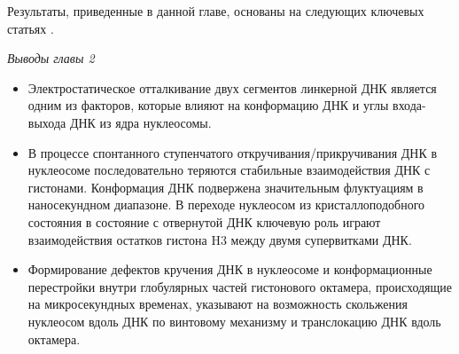 Результаты, приведенные в данной главе, основаны на следующих ключевых статьях  
 \cite{shaytan_coupling_2016,hada_histone_2019,bass_effect_2019,armeev_linking_2019,gribkova_investigation_2017,el_kennani_ms_histonedb_2017,shaytan_trajectories_2016,shaytan_coupling_2016,draizen_histonedb_2016,armeev_nucleosome_2016,shaytan_nucleosome_2015,armeev_conformational_2015,armeev_molecular_2015}.






\textit{Выводы главы 2} \newline

 
\begin{itemize}
    \item Электростатическое отталкивание двух сегментов линкерной ДНК является одним из факторов, которые влияют на конформацию ДНК и углы входа-выхода ДНК из ядра нуклеосомы.
    \item В процессе спонтанного ступенчатого откручивания/прикручивания ДНК в нуклеосоме последовательно теряются стабильные взаимодействия ДНК с гистонами. Конформация ДНК подвержена значительным флуктуациям в наносекундном диапазоне. В переходе нуклеосом из кристаллоподобного состояния в состояние с отвернутой ДНК ключевую роль играют взаимодействия остатков гистона H3 между двумя супервитками ДНК.
    \item Формирование дефектов кручения ДНК в нуклеосоме и конформационные перестройки внутри глобулярных частей гистонового октамера, происходящие на микросекундных временах, указывают на возможность скольжения нуклеосом вдоль ДНК по винтовому механизму и транслокацию ДНК вдоль октамера.
\end{itemize}


